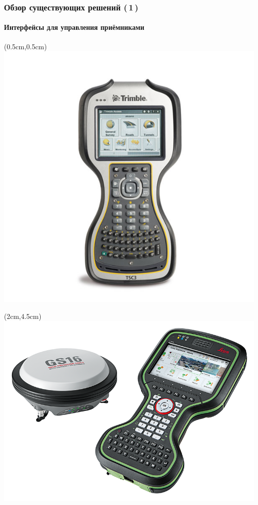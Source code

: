 \documentclass[xetex,с,aspectratio=169]{beamer}
\begin{document}
%
%
\begin{frame}
  \frametitle{Обзор существующих решений (\,1\,)}
  \framesubtitle{Интерфейсы для управления приёмниками}

  \begin{textblock*}{3cm}(0.5cm,0.5cm)
    \includegraphics[width=\textwidth]{../img/trimble-tsc3}
  \end{textblock*}
  \begin{textblock*}{3cm}(2cm,4.5cm)
    \includegraphics[width=\textwidth]{../img/leica-gs16}

\end{textblock*}
\end{frame}
\end{document}

